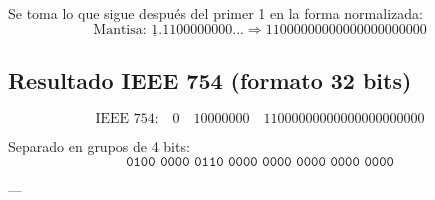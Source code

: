 \documentclass[a4paper,12pt]{article}
\begin{document}
\begin{center}
		Se toma lo que sigue después del primer 1 en la forma normalizada:
		\vspace{-0.5em}
		\[
		\text{Mantisa: } \underline{1}.1100000000... \Rightarrow 11000000000000000000000
		\]
		
		\subsection*{Resultado IEEE 754 (formato 32 bits)}
		
		\[
		\text{IEEE 754:} \quad 
		\boxed{0} \quad \boxed{10000000} \quad \boxed{11000000000000000000000}
		\]
		
		Separado en grupos de 4 bits:
		\vspace{-0.5em}
		\[
		\texttt{0100\ 0000\ 0110\ 0000\ 0000\ 0000\ 0000\ 0000}
		\]
		
		---	
	\end{center}
\end{document}
